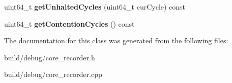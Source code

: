 \begin{DoxyCompactItemize}
\item 
\hypertarget{classCoreRecorder_ae30f7a903534b835fb3eae65728e903f}{uint64\-\_\-t {\bfseries get\-Unhalted\-Cycles} (uint64\-\_\-t cur\-Cycle) const }\label{classCoreRecorder_ae30f7a903534b835fb3eae65728e903f}

\item 
\hypertarget{classCoreRecorder_a3f0d400abd3c59e92dad3424b3319400}{uint64\-\_\-t {\bfseries get\-Contention\-Cycles} () const }\label{classCoreRecorder_a3f0d400abd3c59e92dad3424b3319400}

\end{DoxyCompactItemize}


The documentation for this class was generated from the following files\-:\begin{DoxyCompactItemize}
\item 
build/debug/core\-\_\-recorder.\-h\item 
build/debug/core\-\_\-recorder.\-cpp\end{DoxyCompactItemize}
